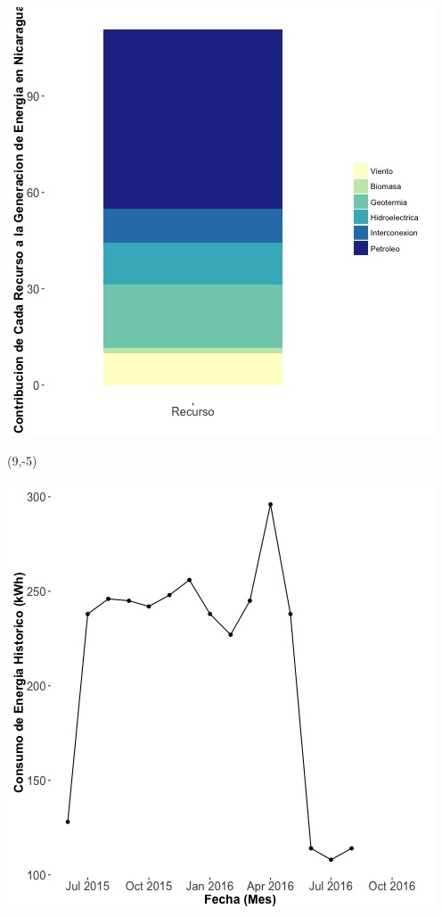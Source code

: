 \documentclass{article}\usepackage[]{graphicx}\usepackage[]{color}
\newenvironment{knitrout}{}{} %
\begin{document}
 \vspace{2cm}

\begin{knitrout}
\color{fgcolor}
\includegraphics[scale=0.65]{figure/gridplot2.jpg} 
\end{knitrout}

 \begin{textblock}{1}(9,-5)
\begin{minipage}{20em}
\begingroup

\endgroup
\end{minipage}
\end{textblock}

\begin{knitrout}
\color{fgcolor}
\includegraphics[scale=0.65]{figure/A28_historico_energia} 
\end{knitrout}
\end{document}
